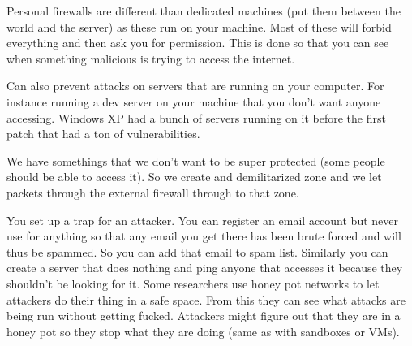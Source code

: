 \documentclass{article}
\begin{document}




































Personal firewalls are different than dedicated machines (put them between the world and the server) as these run on your machine. Most of these will forbid everything and then ask you for permission. This is done so that you can see when something malicious is trying to access the internet. 


Can also prevent attacks on servers that are running on your computer. For instance running a dev server on your machine that you don't want anyone accessing. Windows XP had a bunch of servers running on it before the first patch that had a ton of vulnerabilities. 


We have somethings that we don't want to be super protected (some people should be able to access it). So we create and demilitarized zone and we let packets through the external firewall through to that zone.


You set up a trap for an attacker. You can register an email account but never use for anything so that any email you get there has been brute forced and will thus be spammed. So you can add that email to spam list. Similarly you can create a server that does nothing and ping anyone that accesses it because they shouldn't be looking for it. Some researchers use honey pot networks to let attackers do their thing in a safe space. From this they can see what attacks are being run without getting fucked. Attackers might figure out that they are in a honey pot so they stop what they are doing (same as with sandboxes or VMs). 
\end{document}
